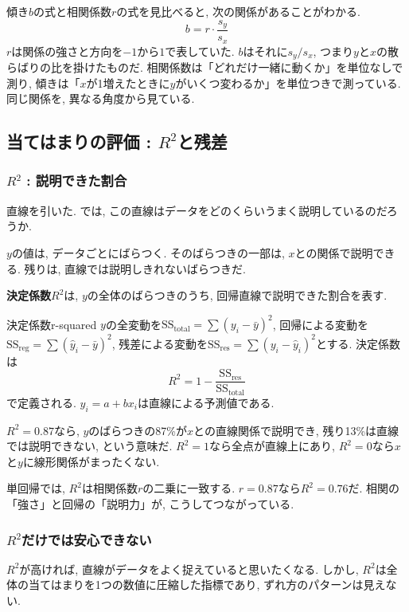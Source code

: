 傾き$b$の式と相関係数$r$の式を見比べると, 次の関係があることがわかる.
\[
  b = r \cdot \frac{s_y}{s_x}
\]
$r$は関係の強さと方向を$-1$から$1$で表していた.
$b$はそれに$s_y / s_x$, つまり$y$と$x$の散らばりの比を掛けたものだ.
相関係数は「どれだけ一緒に動くか」を単位なしで測り, 傾きは「$x$が1増えたときに$y$がいくつ変わるか」を単位つきで測っている.
同じ関係を, 異なる角度から見ている.


\subsection{当てはまりの評価 : $R^2$と残差}

\subsubsection*{$R^2$ : 説明できた割合}

直線を引いた.
では, この直線はデータをどのくらいうまく説明しているのだろうか.

$y$の値は, データごとにばらつく.
そのばらつきの一部は, $x$との関係で説明できる.
残りは, 直線では説明しきれないばらつきだ.

\textbf{決定係数}$R^2$は, $y$の全体のばらつきのうち, 回帰直線で説明できた割合を表す.

\begin{defi}{決定係数}{r-squared}
$y$の全変動を$\mathrm{SS_{total}} = \sum(y_i - \bar{y})^2$, 回帰による変動を$\mathrm{SS_{reg}} = \sum(\hat{y}_i - \bar{y})^2$, 残差による変動を$\mathrm{SS_{res}} = \sum(y_i - \hat{y}_i)^2$とする.
決定係数は
\[
  R^2 = 1 - \frac{\mathrm{SS_{res}}}{\mathrm{SS_{total}}}
\]
で定義される. $\hat{y}_i = a + bx_i$は直線による予測値である.
\end{defi}

$R^2 = 0.87$なら, $y$のばらつきの87\%が$x$との直線関係で説明でき, 残り13\%は直線では説明できない, という意味だ.
$R^2 = 1$なら全点が直線上にあり, $R^2 = 0$なら$x$と$y$に線形関係がまったくない.

単回帰では, $R^2$は相関係数$r$の二乗に一致する.
$r = 0.87$なら$R^2 = 0.76$だ.
相関の「強さ」と回帰の「説明力」が, こうしてつながっている.

\subsubsection*{$R^2$だけでは安心できない}

$R^2$が高ければ, 直線がデータをよく捉えていると思いたくなる.
しかし, $R^2$は全体の当てはまりを1つの数値に圧縮した指標であり, ずれ方のパターンは見えない.

